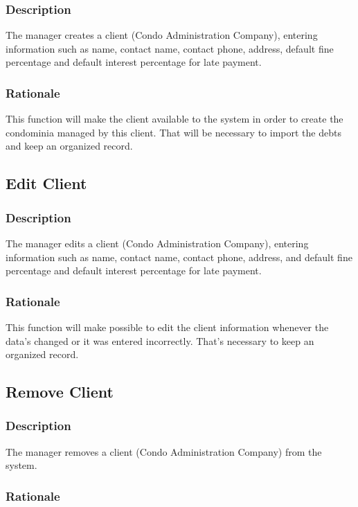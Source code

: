 \documentclass{scrreprt}
\begin{document}
\subsubsection{Description}

The manager creates a client (Condo Administration Company), entering information such as name, contact name, contact phone, address, default fine percentage and default interest percentage for late payment.

\subsubsection{Rationale}

This function will make the client available to the system in order to create the condominia managed by this client. That will be necessary to import the debts and keep an organized record.

\subsection{Edit Client}
\subsubsection{Description}

The manager edits a client (Condo Administration Company), entering information such as name, contact name, contact phone, address, and default fine percentage and default interest percentage for late payment.

\subsubsection{Rationale}

This function will make possible to edit the client information whenever the data's changed or it was entered incorrectly. That's necessary to keep an organized record.

\subsection{Remove Client}
\subsubsection{Description}

The manager removes a client (Condo Administration Company) from the system.

\subsubsection{Rationale}
\end{document}
